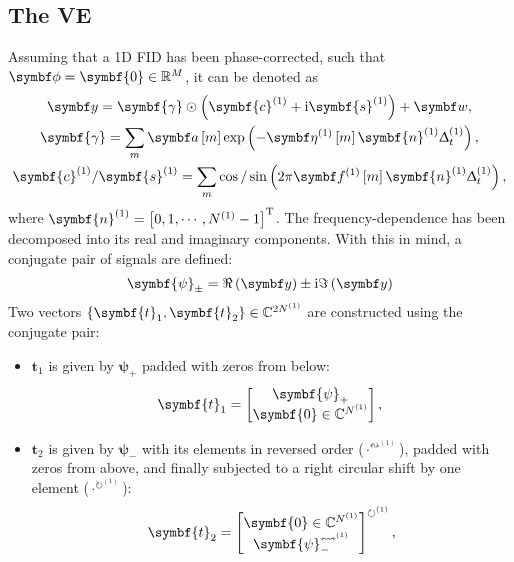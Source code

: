 \subsection{The \acl{VE}}
Assuming that a \ac{1D} \ac{FID} has been phase-corrected, such that $\bdphi =
\symbf{0} \in \mathbb{R}^M$, it can be denoted as
\begin{subequations}
    \begin{gather}
        \by =
        \symbf{\gamma} \odot
            \left(
                \symbf{c}^{(1)} + \iu \symbf{s}^{(1)}
            \right) + \bw, \\
        \symbf{\gamma} = \sum_m \bdam \exp \left(
                - \bdetaone \left[ m \right]
                \symbf{n}^{(1)}_{\vphantom{t}} \Dtone
            \right), \\
            \symbf{c}^{(1)}\text{/}\symbf{s}^{(1)} = \sum_m \cos\text{/}\sin \left(
                2 \pi \bdfone \left[ m \right] \symbf{n}^{(1)}_{\vphantom{t}} \Dtone
            \right),
    \end{gather}
\end{subequations}
where $\symbf{n}^{(1)} = \left[ 0, 1, \cdots, \None - 1\right]\T$.
The frequency-dependence has been decomposed into its real and imaginary
components. With this in mind, a conjugate pair of signals are defined:
\begin{equation}
    \symbf{\psi}_{\pm} = \Re\left(\by\right) \pm \iu \Im\left(\by\right)
\end{equation}
Two vectors $\lbrace \symbf{t}_{1}, \symbf{t}_2 \rbrace \in \mathbb{C}^{2
\None}$ are constructed using the conjugate pair:
\begin{itemize}
    \item $\symbf{t}_1$ is given by $\symbf{\psi}_+$ padded with zeros from below:
        \begin{equation}
            \symbf{t}_1 = \begin{bmatrix}
                \symbf{\psi}_+ \\ \symbf{0} \in \mathbb{C}^{\None}
            \end{bmatrix},\\
        \end{equation}
    \item $\symbf{t}_2$ is given by $\symbf{\psi}_{-}$ with its elements in
        reversed order ($\cdot^{{\leftrightsquigarrow}^{(1)}}$), padded with zeros
        from above, and finally subjected to a right circular shift by one
    element ($\cdot^{{\circlearrowright}^{(1)}}$):
        \begin{equation}
            \symbf{t}_2 = \begin{bmatrix}
                \symbf{0} \in \mathbb{C}^{\None} \\ \symbf{\psi}_-^{{\leftrightsquigarrow}^{(1)}}
        \end{bmatrix}^{{\circlearrowright}^{(1)}},
       \end{equation}
\end{itemize}

